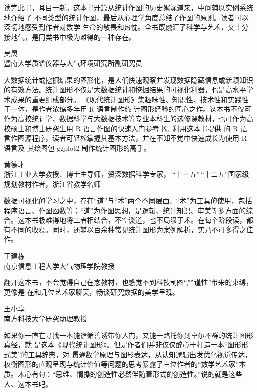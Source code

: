 \documentclass[
  b5paper,
  UTF8,twoside]{book}
\begin{document}
读完此书，耳目一新。这本书开篇从统计作图的历史娓娓道来，中间辅以实例系统地介绍了 不同类型的统计作图，最后从心理学角度总结了作图的原则。读者可以深切地感受到作者对数学 生命的敬畏和热忱。全书既融汇了科学与艺术，又十分接地气，是同类书中极为难得的一种存在。

\begin{flushright}
吴晟\\
暨南大学质谱仪器与大气环境研究所副研究员
\end{flushright}

大数据统计或挖掘结果的图形化，是人们快速观察并发现数据隐藏信息或新颖知识的有效方法。统计图形不仅是大数据统计和挖掘结果的可视化利器，也是高水平学术成果的重要组成部分。
《现代统计图形》集趣味性、知识性、技术性和实践性于一体，是作者浓缩多年用 R 语言制作统 计图形经验的匠心之作。这本书不仅可作为高校统计学、数据科学与大数据技术等专业本科生的选修课教材，也可作为高校硕士和博士研究生用 R 语言作图的快速入门参考书。利用这本书提供 的 R 语言作图源程序，读者可轻松掌握其基本方法，并在不知不觉中快速成长为使用 R 语言及 其绘图包 ggplot2 制作统计图形的高手。

\begin{flushright}
黄德才\\
浙江工业大学教授、博士生导师，资深数据科学专家，
``十一五''\,``十二五''国家级规划教材作者，浙江省教学名师
\end{flushright}

数据可视化的学习之中，存在``道''与``术''两个不同层面。``术''为工具的使用，包括程序语言、作图函数等；``道''为作图思想，是逻辑、统计知识、审美等多方面的综合。这本书极难得地将二者相结合，不空谈道，也不局限于术。在每个阶段读，都有不同的收获。同时，还辅以百余种常见统计图形为案例解析，实乃不可多得之佳作。

\begin{flushright}
王建栋\\
南京信息工程大学大气物理学院教授
\end{flushright}

翻开这本书，不会觉得自己在念教材，也感觉不到科技制图``严谨性''带来的束缚，更像是
在和几位艺术家聊天，畅谈研究数据的美学呈现。

\begin{flushright}
王小享\\
南方科技大学研究助理教授
\end{flushright}

如果你一直在寻找一本能循循善诱带你入门，又能一路托你到卓尔不群的统计图形真经，就 是这本《现代统计图形》。但是作者们并非仅仅醉心于打造一本``图形形式美''的工具辞典，对 贯通数学原理与图形表达，从认知逻辑出发优化视觉传达，权衡图形的直观呈现与统计价值等问题的思考暴露了三位作者的``数学艺术家''本质。木心有句：``思维、情操的创造性必然伴随着形式的创造性。''说的就是这些人、这本书吧。
\end{document}
